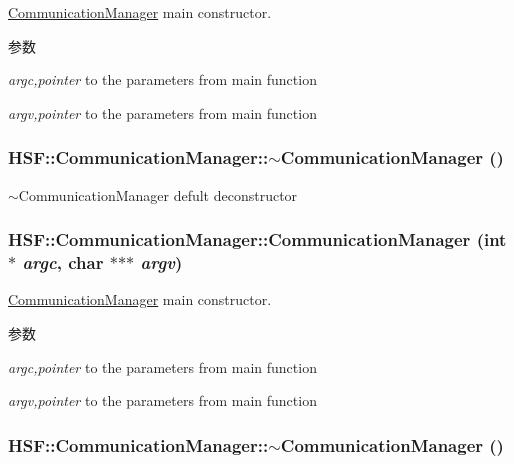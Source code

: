 \hyperlink{classHSF_1_1CommunicationManager}{CommunicationManager} main constructor. 
\begin{DoxyParams}{参数}
\item[{\em argc,pointer}]to the parameters from main function \item[{\em argv,pointer}]to the parameters from main function \end{DoxyParams}
\hypertarget{classHSF_1_1CommunicationManager_ab98fc8b313467c85105bad87a7195cd8}{
\subsubsection[{$\sim$CommunicationManager}]{\setlength{\rightskip}{0pt plus 5cm}HSF::CommunicationManager::$\sim$CommunicationManager ()}}
\label{classHSF_1_1CommunicationManager_ab98fc8b313467c85105bad87a7195cd8}


$\sim$CommunicationManager defult deconstructor \hypertarget{classHSF_1_1CommunicationManager_a2323f6f52600227b24cf9e5419565206}{
\subsubsection[{CommunicationManager}]{\setlength{\rightskip}{0pt plus 5cm}HSF::CommunicationManager::CommunicationManager (int $\ast$ {\em argc}, \/  char $\ast$$\ast$$\ast$ {\em argv})}}
\label{classHSF_1_1CommunicationManager_a2323f6f52600227b24cf9e5419565206}


\hyperlink{classHSF_1_1CommunicationManager}{CommunicationManager} main constructor. 
\begin{DoxyParams}{参数}
\item[{\em argc,pointer}]to the parameters from main function \item[{\em argv,pointer}]to the parameters from main function \end{DoxyParams}
\hypertarget{classHSF_1_1CommunicationManager_ab98fc8b313467c85105bad87a7195cd8}{
\subsubsection[{$\sim$CommunicationManager}]{\setlength{\rightskip}{0pt plus 5cm}HSF::CommunicationManager::$\sim$CommunicationManager ()}}
\label{classHSF_1_1CommunicationManager_ab98fc8b313467c85105bad87a7195cd8}


